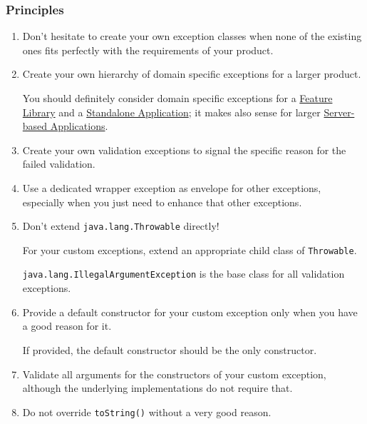 \subsubsection{Principles}
\begin{enumerate}[label=P\arabic*.]
	\item{Don't hesitate to create your own exception classes when none of the existing ones fits perfectly with the requirements of your product.}

	\item{Create your own hierarchy of domain specific exceptions for a larger product.
	
	You should definitely consider domain specific exceptions for a \hyperref[sec:FeatureLibrary]{Feature Library} and a \hyperref[sec:StandaloneApplication]{Standalone Application}; it makes also sense for larger \hyperref[sec:ServerbasedApplication]{Server-based Applications}.}

	\item{Create your own validation exceptions to signal the specific reason for the failed validation.}
	
	\item{Use a dedicated wrapper exception as envelope for other exceptions, especially when you just need to enhance that other exceptions.}

	\item{Don't extend \lstinline|java.lang.Throwable| directly!
	
	For your custom exceptions, extend an appropriate child class of \lstinline|Throwable|.
	
	\lstinline|java.lang.IllegalArgumentException| is the base class for all validation exceptions.}
	
	\item{Provide a default constructor for your custom exception only when you have a good reason for it.
	
	If provided, the default constructor should be the only constructor.}
	
	\item{Validate all arguments for the constructors of your custom exception, although the underlying implementations do not require that.}
	
	\item{Do not override \lstinline|toString()| without a very good reason.}
\end{enumerate}

